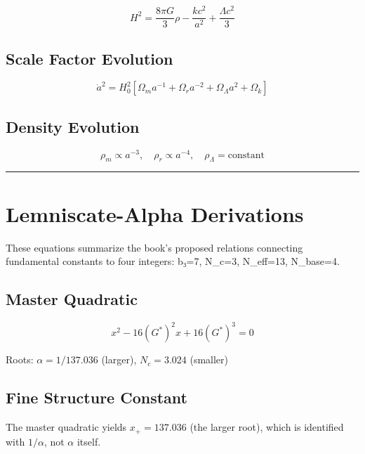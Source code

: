 \documentclass[
  11pt,
  letterpaper,
  twoside,
  openany]{book}
\makeatletter
\let\orig@section\section
\renewcommand{\section}{\needspace{8\baselineskip}\orig@section}
\let\orig@subsection\subsection
\renewcommand{\subsection}{\needspace{6\baselineskip}\orig@subsection}
\makeatother
\begin{document}
\[
H^2 = \frac{8\pi G}{3}\rho - \frac{k c^2}{a^2} + \frac{\Lambda c^2}{3}
\]

\subsection{Scale Factor Evolution}\label{scale-factor-evolution}

\[
\dot{a}^2 = H_0^2\left[\Omega_m a^{-1} + \Omega_r a^{-2} + \Omega_\Lambda a^2 + \Omega_k\right]
\]

\subsection{Density Evolution}\label{density-evolution}

\[
\rho_m \propto a^{-3}, \quad \rho_r \propto a^{-4}, \quad \rho_\Lambda = \text{constant}
\]

\begin{center}\rule{0.5\linewidth}{0.5pt}\end{center}

\section{Lemniscate-Alpha
Derivations}\label{lemniscate-alpha-derivations}

These equations summarize the book's proposed relations connecting
fundamental constants to four integers: b₃=7, N\_c=3, N\_eff=13,
N\_base=4.

\subsection{Master Quadratic}\label{master-quadratic}

\[
x^2 - 16(G^*)^2 x + 16(G^*)^3 = 0
\]

Roots: \(\alpha = 1/137.036\) (larger), \(N_c = 3.024\) (smaller)

\subsection{Fine Structure Constant}\label{fine-structure-constant}

\begin{tcolorbox}[enhanced jigsaw, colbacktitle=quarto-callout-warning-color!10!white, titlerule=0mm, bottomtitle=1mm, bottomrule=.15mm, colback=white, arc=.35mm, breakable, toprule=.15mm, title=\textcolor{quarto-callout-warning-color}{\faExclamationTriangle}\hspace{0.5em}{Notation Clarification}, rightrule=.15mm, coltitle=black, leftrule=.75mm, colframe=quarto-callout-warning-color-frame, toptitle=1mm, opacityback=0, opacitybacktitle=0.6, left=2mm]

The master quadratic yields \(x_+ = 137.036\) (the larger root), which
is identified with \(1/\alpha\), not \(\alpha\) itself.

\end{tcolorbox}
\end{document}

